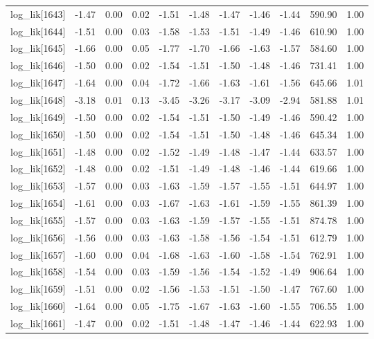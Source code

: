 \begin{table}[ht]
\begin{tabular}{rrrrrrrrrrr}
  log\_lik[1643] & -1.47 & 0.00 & 0.02 & -1.51 & -1.48 & -1.47 & -1.46 & -1.44 & 590.90 & 1.00 \\ 
  log\_lik[1644] & -1.51 & 0.00 & 0.03 & -1.58 & -1.53 & -1.51 & -1.49 & -1.46 & 610.90 & 1.00 \\ 
  log\_lik[1645] & -1.66 & 0.00 & 0.05 & -1.77 & -1.70 & -1.66 & -1.63 & -1.57 & 584.60 & 1.00 \\ 
  log\_lik[1646] & -1.50 & 0.00 & 0.02 & -1.54 & -1.51 & -1.50 & -1.48 & -1.46 & 731.41 & 1.00 \\ 
  log\_lik[1647] & -1.64 & 0.00 & 0.04 & -1.72 & -1.66 & -1.63 & -1.61 & -1.56 & 645.66 & 1.01 \\ 
  log\_lik[1648] & -3.18 & 0.01 & 0.13 & -3.45 & -3.26 & -3.17 & -3.09 & -2.94 & 581.88 & 1.01 \\ 
  log\_lik[1649] & -1.50 & 0.00 & 0.02 & -1.54 & -1.51 & -1.50 & -1.49 & -1.46 & 590.42 & 1.00 \\ 
  log\_lik[1650] & -1.50 & 0.00 & 0.02 & -1.54 & -1.51 & -1.50 & -1.48 & -1.46 & 645.34 & 1.00 \\ 
  log\_lik[1651] & -1.48 & 0.00 & 0.02 & -1.52 & -1.49 & -1.48 & -1.47 & -1.44 & 633.57 & 1.00 \\ 
  log\_lik[1652] & -1.48 & 0.00 & 0.02 & -1.51 & -1.49 & -1.48 & -1.46 & -1.44 & 619.66 & 1.00 \\ 
  log\_lik[1653] & -1.57 & 0.00 & 0.03 & -1.63 & -1.59 & -1.57 & -1.55 & -1.51 & 644.97 & 1.00 \\ 
  log\_lik[1654] & -1.61 & 0.00 & 0.03 & -1.67 & -1.63 & -1.61 & -1.59 & -1.55 & 861.39 & 1.00 \\ 
  log\_lik[1655] & -1.57 & 0.00 & 0.03 & -1.63 & -1.59 & -1.57 & -1.55 & -1.51 & 874.78 & 1.00 \\ 
  log\_lik[1656] & -1.56 & 0.00 & 0.03 & -1.63 & -1.58 & -1.56 & -1.54 & -1.51 & 612.79 & 1.00 \\ 
  log\_lik[1657] & -1.60 & 0.00 & 0.04 & -1.68 & -1.63 & -1.60 & -1.58 & -1.54 & 762.91 & 1.00 \\ 
  log\_lik[1658] & -1.54 & 0.00 & 0.03 & -1.59 & -1.56 & -1.54 & -1.52 & -1.49 & 906.64 & 1.00 \\ 
  log\_lik[1659] & -1.51 & 0.00 & 0.02 & -1.56 & -1.53 & -1.51 & -1.50 & -1.47 & 767.60 & 1.00 \\ 
  log\_lik[1660] & -1.64 & 0.00 & 0.05 & -1.75 & -1.67 & -1.63 & -1.60 & -1.55 & 706.55 & 1.00 \\ 
  log\_lik[1661] & -1.47 & 0.00 & 0.02 & -1.51 & -1.48 & -1.47 & -1.46 & -1.44 & 622.93 & 1.00 \\ 

\end{tabular}
\end{table}
